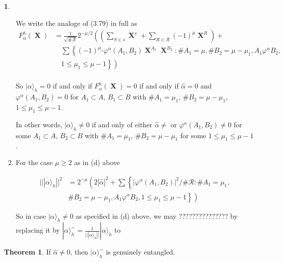 \documentclass[a4paper,12pt]{article}
\DeclareMathOperator{\x}{\mathrm{X}}
\theoremstyle{definition}
\theoremstyle{underlinethm}
\newtheorem{thm}{Theorem}[section]
\theoremstyle{definition}
\newtheorem{subsubsec}{}[subsection]
\begin{document}
\begin{subsubsec}
\begin{enumerate}[label = (\alph*)]
We write the analoge of (3.79) in full as
\begin{align*}
F_{\alpha}^{h} (\boldsymbol{\x}) &= \frac{1}{\sqrt{\# \mathcal{R}}} 2^{-\mu/2} \left( \left(\sum_{S \in s} \boldsymbol{\x}^{s} + \sum_{R \in \mathcal{R}} (-1)^{\mu} \boldsymbol{\x}^{R} \right) +\right.\\
&\quad\sum \left\{(-1)^{\mu_{1}} \varphi^{\alpha} (A_{1}, B_{2}) \boldsymbol{\x}^{A_{1}} \boldsymbol{\x}^{B_{2}} : \# A_{1}= \mu, \# B_{2} = \mu-\mu_{1}, A_{1} \varphi^{\alpha} B_{2},\right.\\
 &\quad\left.\left. 1 \leq \mu_{1} \leq \mu-1\right\} \right)\tag{4.53}\label{eq-4.53}\\ 
\end{align*}
 
So $| \alpha \rangle_{h} =0$ if and only if $F_{\alpha}^{h} (\boldsymbol{\x})=0$ if and only if $\hat{\alpha}=0$ and $\varphi^{\alpha}(A_{1}, B_{2}) =0$ for $A_{1} \subset A$, $B_{1} \subset B$ with $\# A_{1}= \mu_{1}$, $\# B_{2}=\mu-\mu_{1}$, $ 1 \leq \mu_{1} \leq \mu-1$. 

In other words, $| \alpha \rangle_{h} \neq 0$ if and only of either $\hat{\alpha} \neq $ or $\varphi^{\alpha}(A_{1}, B_{2}) \neq 0$ for some $A_{1}\subset A$, $B_{2}\subset B$ with $\# A_{1} = \mu_{1}$, $\# B_{2} = \mu-\mu_{1}$ for some $1 \leq \mu_{1} \leq \mu-1$.

\item For the case $\mu \geq 2$ as in (d) above

\begin{align*}
|| | \alpha \rangle_{h} ||^{2} &= 2^{-\mu} \left(2| \hat{\alpha} |^{2} \right.+ \sum \left\{ | \varphi^{\alpha}(A_{1}, B_{2}) |^{2}/\#\mathcal{R} : \# A_{1} = \mu_{1},\right.\\ 
&\left. \left.\# B_{2} = \mu-\mu_{1}, A_{1} \varphi^{\alpha} B_{2}, 1 \leq \mu_{1} \leq \mu-1 \right\}\right)\tag{4.54}\label{eq-4.54}
\end{align*}
  
So in case $| \alpha \rangle_{h} \neq 0$ as specified in (d) above, we may ??????????????? by replacing it by  $| \alpha \rangle_{h}^{\sim} = \frac{1}{|| | \alpha \rangle_{h} ||} | \alpha \rangle_{h}$ to  
\end{enumerate}

\end{subsubsec}

\begin{thm}\label{thm-4.4}
If $\hat{\alpha} \neq 0$, then $| \alpha \rangle_{h}^{\sim}$ is genuinely entangled.
\end{thm}
\end{document}
